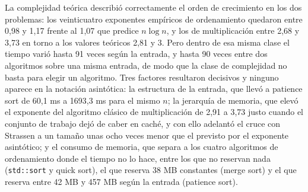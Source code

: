 
La complejidad teórica describió correctamente el orden de crecimiento en los
dos problemas: los veinticuatro exponentes empíricos de ordenamiento quedaron
entre 0,98 y 1,17 frente al 1,07 que predice $n \log n$, y los de multiplicación
entre 2,68 y 3,73 en torno a los valores teóricos 2,81 y 3. Pero dentro de esa
misma clase el tiempo varió hasta 91 veces según la entrada, y hasta 90 veces
entre dos algoritmos sobre una misma entrada, de modo que la clase de
complejidad no basta para elegir un algoritmo. Tres factores resultaron
decisivos y ninguno aparece en la notación asintótica: la estructura de la
entrada, que llevó a patience sort de 60,1 ms a 1693,3 ms para el mismo $n$; la
jerarquía de memoria, que elevó el exponente del algoritmo clásico de
multiplicación de 2,91 a 3,73 justo cuando el conjunto de trabajo dejó de caber
en caché, y con ello adelantó el cruce con Strassen a un tamaño unas ocho veces
menor que el previsto por el exponente asintótico; y el consumo de memoria, que separa a los cuatro algoritmos de
ordenamiento donde el tiempo no lo hace, entre los que no reservan nada
(\texttt{std::sort} y quick sort), el que reserva 38 MB constantes (merge sort)
y el que reserva entre 42 MB y 457 MB según la entrada (patience sort).
